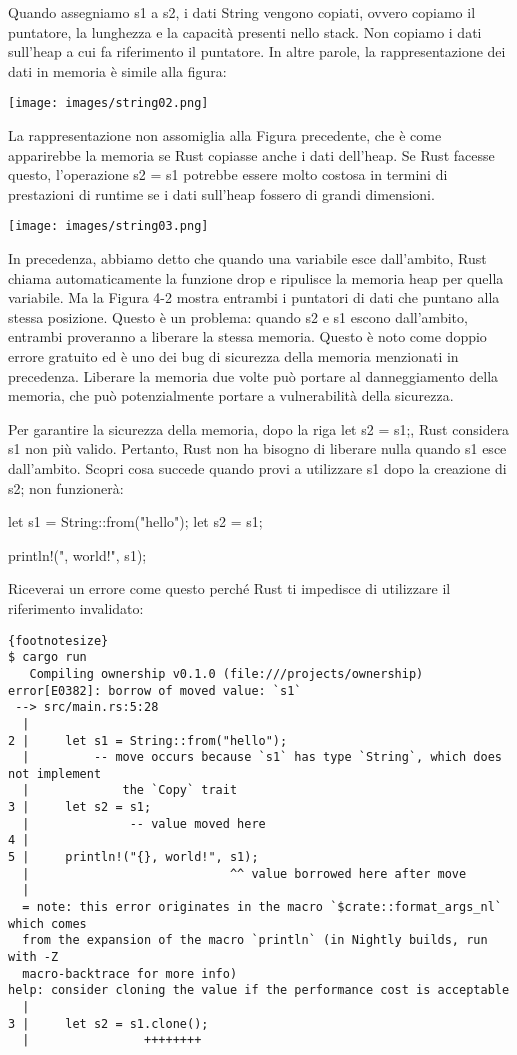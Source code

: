 \documentclass[11pt,a4paper]{article}
\begin{document}
{Quando assegniamo s1 a s2, i dati String vengono copiati, ovvero copiamo il puntatore, la lunghezza e la capacità presenti nello stack. Non copiamo i dati sull'heap a cui fa riferimento il puntatore. In altre parole, la rappresentazione dei dati in memoria è simile alla figura:

\begin{center}
\texttt{[image: images/string02.png]}
\end{center}
La rappresentazione non assomiglia alla Figura precedente, che è come apparirebbe la memoria se Rust copiasse anche i dati dell'heap. Se Rust facesse questo, l'operazione s2 = s1 potrebbe essere molto costosa in termini di prestazioni di runtime se i dati sull'heap fossero di grandi dimensioni.

\begin{center}
\texttt{[image: images/string03.png]}
\end{center}

In precedenza, abbiamo detto che quando una variabile esce dall'ambito, Rust chiama automaticamente la funzione drop e ripulisce la memoria heap per quella variabile. Ma la Figura 4-2 mostra entrambi i puntatori di dati che puntano alla stessa posizione. Questo è un problema: quando s2 e s1 escono dall'ambito, entrambi proveranno a liberare la stessa memoria. Questo è noto come doppio errore gratuito ed è uno dei bug di sicurezza della memoria menzionati in precedenza. Liberare la memoria due volte può portare al danneggiamento della memoria, che può potenzialmente portare a vulnerabilità della sicurezza.

Per garantire la sicurezza della memoria, dopo la riga let s2 = s1;, Rust considera s1 non più valido. Pertanto, Rust non ha bisogno di liberare nulla quando s1 esce dall'ambito. Scopri cosa succede quando provi a utilizzare s1 dopo la creazione di s2; non funzionerà:

\begin{rust}
    let s1 = String::from("hello");
    let s2 = s1;

    println!("{}, world!", s1);
\end{rust}
Riceverai un errore come questo perché Rust ti impedisce di utilizzare il riferimento invalidato:

\begin{verbatim}{footnotesize}
$ cargo run
   Compiling ownership v0.1.0 (file:///projects/ownership)
error[E0382]: borrow of moved value: `s1`
 --> src/main.rs:5:28
  |
2 |     let s1 = String::from("hello");
  |         -- move occurs because `s1` has type `String`, which does not implement 
  |				the `Copy` trait
3 |     let s2 = s1;
  |              -- value moved here
4 |
5 |     println!("{}, world!", s1);
  |                            ^^ value borrowed here after move
  |
  = note: this error originates in the macro `$crate::format_args_nl` which comes 
  from the expansion of the macro `println` (in Nightly builds, run with -Z 
  macro-backtrace for more info)
help: consider cloning the value if the performance cost is acceptable
  |
3 |     let s2 = s1.clone();
  |                ++++++++


\end{verbatim}}
\end{document}
